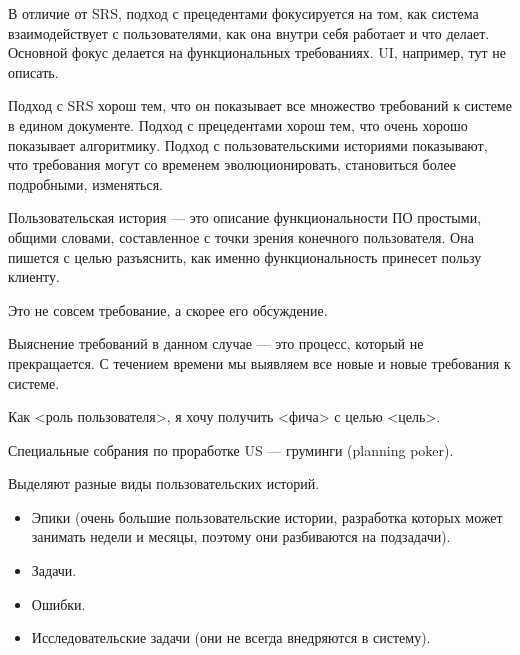     \begin{Rem}
        В отличие от SRS, подход с прецедентами фокусируется на том, как система взаимодействует с пользователями, как она внутри себя работает и что делает. Основной фокус делается на функциональных требованиях. UI, например, тут не описать.
    \end{Rem}


    \begin{Rem}
        Подход с SRS хорош тем, что он показывает все множество требований к системе в едином документе. Подход с прецедентами хорош тем, что очень хорошо показывает алгоритмику. Подход с пользовательскими историями показывают, что требования могут со временем эволюционировать, становиться более подробными, изменяться.
    \end{Rem}
    
    \begin{Def}
        Пользовательская история --- это описание функциональности ПО простыми, общими словами, составленное с точки зрения конечного пользователя. Она пишется с целью разъяснить, как именно функциональность принесет пользу клиенту.
    \end{Def}

    \begin{Rem}
        Это не совсем требование, а скорее его обсуждение.
    \end{Rem}

    \begin{Rem}
        Выяснение требований в данном случае --- это процесс, который не прекращается. С течением времени мы выявляем все новые и новые требования к системе.
    \end{Rem}

    \begin{Rem}[Шаблон]
        Как <роль пользователя>, я хочу получить <фича> с целью <цель>.
    \end{Rem}

    \begin{Rem}
        Специальные собрания по проработке US --- груминги (planning poker).
    \end{Rem}
    
    \begin{Def}
        Выделяют разные виды пользовательских историй.
        \begin{itemize}
            \item Эпики (очень большие пользовательские истории, разработка которых может занимать недели и месяцы, поэтому они разбиваются на подзадачи).
            \item Задачи.
            \item Ошибки.
            \item Исследовательские задачи (они не всегда внедряются в систему).
        \end{itemize}
    \end{Def}

